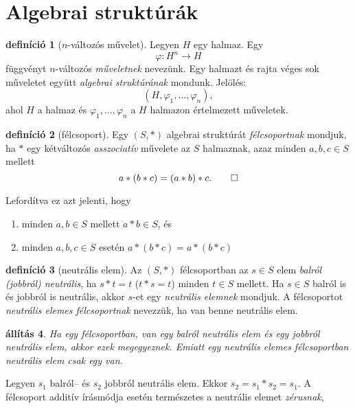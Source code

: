 \documentclass[9pt, a4paper, showtrims]{memoir}
\makeatletter
\renewenvironment{proof}[1][\proofname]
    {\par\pushQED{\qed}%
    \normalfont \topsep6\p@\@plus6\p@\relax
    \trivlist
    \item[\hskip\labelsep
        \itshape
    #1\@addpunct{:}]\ignorespaces}
    {\popQED\endtrivlist\@endpefalse}
\theoremstyle{plain}
\newtheorem{proposition}{állítás}[chapter]
\theoremstyle{remark}
\theoremstyle{definition}
\newtheorem{definition}[proposition]{definíció}
\makeatother
\begin{document}
\section{Algebrai struktúrák}
\begin{definition}[$n$-változós művelet]
	Legyen $H$ egy halmaz. Egy
	\[
		\varphi\colon H^n\to H
	\]
	függvényt $n$-változós \emph{műveletnek} nevezünk.
	Egy halmazt és rajta véges sok műveletet együtt \emph{algebrai struktúrának} mondunk.
	Jelölés:
	$$\left(H,\varphi_1,\ldots,\varphi_n  \right),$$
	ahol $H$ a halmaz és
	$\varphi_1,\ldots,\varphi_n$ a $H$ halmazon értelmezett műveletek.
\end{definition}
\begin{definition}[félcsoport]
	Egy $\left( S,\ast \right)$ algebrai struktúrát \emph{félcsoportnak} mondjuk,
	ha $\ast$ egy kétváltozós \emph{asszociatív}
	művelete az $S$ halmaznak,
	azaz minden $a,b,c\in S$ mellett
	\[
		a\ast\left( b\ast c \right)=\left( a\ast b\right)\ast c.\qedhere
	\]
\end{definition}
Lefordítva ez azt jelenti, hogy
\begin{enumerate}
	\item minden $a,b\in S$ mellett $a\ast b\in S$, és
	\item minden $a,b,c\in S$ esetén $a\ast\left( b\ast c \right)=a\ast\left( b\ast c \right)$
\end{enumerate}
\begin{definition}[neutrális elem]
	Az $\left( S,\ast \right)$ félcsoportban az $s\in S$ elem \emph{balról (jobbról) neutrális},
	ha $s\ast t=t$ ($t\ast s=t$) minden $t\in S$ mellett.
	Ha $s\in S$ balról is és jobbról is neutrális, akkor $s$-et egy \emph{neutrális elemnek}
	mondjuk.
	A félcsoportot \emph{neutrális elemes félcsoportnak} nevezzük, ha van benne neutrális elem.
\end{definition}
\begin{proposition}
	Ha egy félcsoportban, van egy balról neutrális elem és egy jobbról neutrális elem,
	akkor ezek megegyeznek.
	Emiatt egy neutrális elemes félcsoportban neutrális elem csak egy van.
\end{proposition}
\begin{proof}
	Legyen $s_1$ balról-- és $s_2$ jobbról neutrális elem.
	Ekkor
	\(
	s_2=s_1\ast s_2=s_1.
	\)
\end{proof}
A félcsoport additív írásmódja esetén természetes a neutrális elemet \emph{zérusnak},
\end{document}
